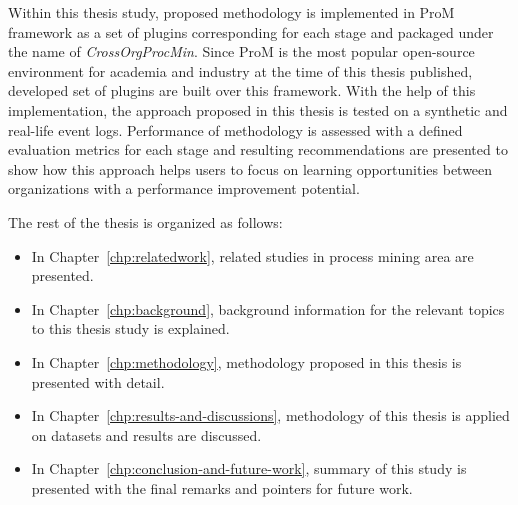 Within this thesis study, proposed methodology is implemented in ProM framework \cite{verbeek2010prom} as a set of plugins corresponding for each stage and packaged under the name of \textit{CrossOrgProcMin}. Since ProM is the most popular open-source environment for academia and industry at the time of this thesis published, developed set of plugins are built over this framework. With the help of this implementation, the approach proposed in this thesis is tested on a synthetic and real-life event logs. Performance of methodology is assessed with a defined evaluation metrics for each stage and resulting recommendations are presented to show how this approach helps users to focus on learning opportunities between organizations with a performance improvement potential.

The rest of the thesis is organized as follows:
\begin{itemize}
	\item In Chapter~\ref{chp:relatedwork}, related studies in process mining area are presented. 
	\item In Chapter~\ref{chp:background}, background information for the relevant topics to this thesis study is explained.
	\item In Chapter~\ref{chp:methodology}, methodology proposed in this thesis is presented with detail.
	\item In Chapter~\ref{chp:results-and-discussions}, methodology of this thesis is applied on datasets and results are discussed.
	\item In Chapter~\ref{chp:conclusion-and-future-work}, summary of this study is presented with the final remarks and pointers for future work. 
\end{itemize}

